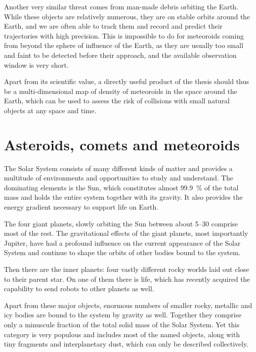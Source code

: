     Another very similar threat comes from man-made debris orbiting the Earth.
    While these objects are relatively numerous, they are on stable orbits around
    the Earth, and we are often able to track them and record and predict their trajectories with high precision.
    This is impossible to do for meteoroids coming from beyond the sphere of influence of the Earth,
    as they are usually too small and faint to be detected before their approach,
    and the available observation window is very short.

    Apart from its scientific value, a directly useful product of the thesis should thus
    be a multi-dimensional map of density of meteoroids in the space around the Earth,
    which can be used to assess the risk of collisions with small natural objects
    at any space and time.

\section{Asteroids, comets and meteoroids} \label{ia}
    The Solar System consists of many different kinds of matter and provides a multitude
    of environments and opportunities to study and understand.
    The dominating elements is the Sun, which constitutes almost \SI{99.9}{\percent} of the total mass
    and holds the entire system together with its gravity.
    It also provides the energy gradient necessary to support life on Earth.

    The four giant planets, slowly orbiting the Sun between about \SIrange[range-phrase = {\ and\ }]{5}{30}{\au}
    comprise most of the rest. The gravitational effects of the giant planets, most importantly Jupiter,
    have had a profound influence on the current appearance of the Solar System and continue to
    shape the orbits of other bodies bound to the system.

    Then there are the inner planets: four vastly different rocky worlds laid out
    close to their parent star. On one of them there is life,
    which has recently acquired the capability to send robots to other planets as well.

    Apart from these major objects, enormous numbers of smaller rocky, metallic and icy
    bodies are bound to the system by gravity as well. Together they comprise only a minuscule
    fraction of the total solid mass of the Solar System. Yet this category is very populous
    and includes most of the named objects, along with tiny fragments and interplanetary dust,
    which can only be described collectively.

